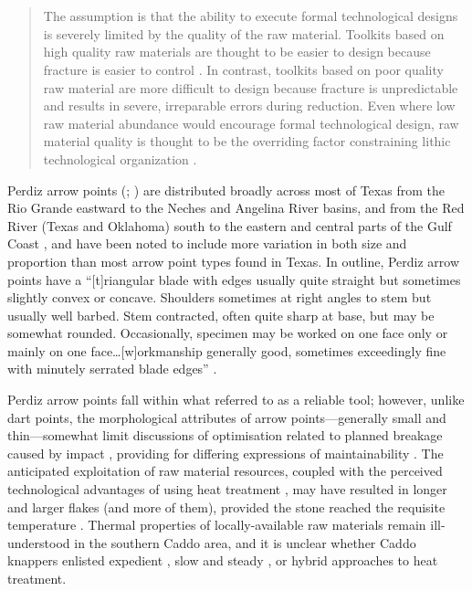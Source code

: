 \documentclass[review]{elsarticle}
\begin{document}
\linenumbers

\section*{}

\begin{quote}
The assumption is that the ability to execute formal technological designs is severely limited by the quality of the raw material. Toolkits based on high quality raw materials are thought to be easier to design because fracture is easier to control \citep{RN4315,RN8924}. In contrast, toolkits based on poor quality raw material are more difficult to design because fracture is unpredictable and results in severe, irreparable errors during reduction. Even where low raw material abundance would encourage formal technological design, raw material quality is thought to be the overriding factor constraining lithic technological organization \citep[257]{RN5907}.
\end{quote}

Perdiz arrow points (\citealp[283 and Plate 142]{RN7795}; \citealp[504 and Plate 131]{RN5769}) are distributed broadly across most of Texas from the Rio Grande eastward to the Neches and Angelina River basins, and from the Red River (Texas and Oklahoma) south to the eastern and central parts of the Gulf Coast \citep[Figure 40]{RN9010}, and have been noted to include more variation in both size and proportion than most arrow point types found in Texas. In outline, Perdiz arrow points have a “[t]riangular blade with edges usually quite straight but sometimes slightly convex or concave. Shoulders sometimes at right angles to stem but usually well barbed. Stem contracted, often quite sharp at base, but may be somewhat rounded. Occasionally, specimen may be worked on one face only or mainly on one face…[w]orkmanship generally good, sometimes exceedingly fine with minutely serrated blade edges” \cite[504]{RN5769}. 

Perdiz arrow points fall within what \citet[738-741]{RN5873} referred to as a reliable tool; however, unlike dart points, the morphological attributes of arrow points---generally small and thin---somewhat limit discussions of optimisation related to planned breakage caused by impact \citep{RN6170,RN7045}, providing for differing expressions of maintainability \citep{RN5789}. The anticipated exploitation of raw material resources, coupled with the perceived technological advantages of using heat treatment \citep{RN6171}, may have resulted in longer and larger flakes (and more of them), provided the stone reached the requisite temperature \citep{RN5900}. Thermal properties of locally-available raw materials remain ill-understood in the southern Caddo area, and it is unclear whether Caddo knappers enlisted expedient \citep{RN8970,RN6201}, slow and steady \citep{RN8971}, or hybrid approaches to heat treatment.
\end{document}
